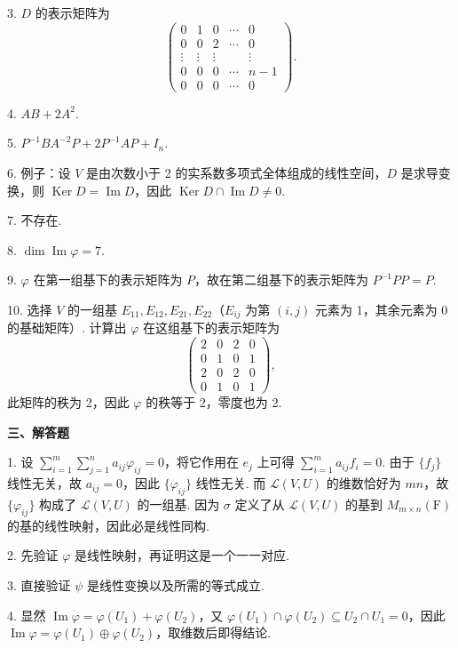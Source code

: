 \documentclass[UTF8, 12pt, fontset=fandol, oneside]{ctexart}
\begin{document}
3. $D$ 的表示矩阵为
\[
\left(\begin{array}{ccccc}
0 & 1 & 0 & \cdots & 0\\
0 & 0 & 2 & \cdots & 0\\
\vdots & \vdots & \vdots &        & \vdots\\
0 & 0 & 0 & \cdots & n-1\\
0 & 0 & 0 & \cdots & 0
\end{array}\right).
\]

4. $AB+2A^2$.

5. $P^{-1}BA^{-2}P+2P^{-1}AP+I_n$.

6. 例子：设 $V$ 是由次数小于 2 的实系数多项式全体组成的线性空间，$D$ 是求导变换，则 $\operatorname{Ker}D=\operatorname{Im}D$，因此 $\operatorname{Ker}D\cap\operatorname{Im}D\ne0$.

7. 不存在.

8. $\dim\operatorname{Im}\varphi=7$.

9. $\varphi$ 在第一组基下的表示矩阵为 $P$，故在第二组基下的表示矩阵为 $P^{-1}PP=P$.

10. 选择 $V$ 的一组基 $E_{11},E_{12},E_{21},E_{22}$（$E_{ij}$ 为第 $(i,j)$ 元素为 1，其余元素为 0 的基础矩阵）. 计算出 $\varphi$ 在这组基下的表示矩阵为
\[
\left(\begin{array}{rrrr}
2 & 0 & 2 & 0\\
0 & 1 & 0 & 1\\
2 & 0 & 2 & 0\\
0 & 1 & 0 & 1
\end{array}\right),
\]
此矩阵的秩为 2，因此 $\varphi$ 的秩等于 2，零度也为 2.

\noindent\textbf{三、解答题}

1. 设 $\sum_{i=1}^m\sum_{j=1}^n a_{ij}\varphi_{ij}=0$，将它作用在 $e_j$ 上可得 $\sum_{i=1}^m a_{ij}f_i=0$. 由于 $\{f_j\}$ 线性无关，故 $a_{ij}=0$，因此 $\{\varphi_{ij}\}$ 线性无关. 而 $\mathcal{L}(V,U)$ 的维数恰好为 $mn$，故 $\{\varphi_{ij}\}$ 构成了 $\mathcal{L}(V,U)$ 的一组基. 因为 $\sigma$ 定义了从 $\mathcal{L}(V,U)$ 的基到 $M_{m\times n}(\mathrm{F})$ 的基的线性映射，因此必是线性同构.

2. 先验证 $\varphi$ 是线性映射，再证明这是一个一一对应.

3. 直接验证 $\psi$ 是线性变换以及所需的等式成立.

4. 显然 $\operatorname{Im}\varphi=\varphi(U_1)+\varphi(U_2)$，又 $\varphi(U_1)\cap\varphi(U_2)\subseteq U_2\cap U_1=0$，因此 $\operatorname{Im}\varphi=\varphi(U_1)\oplus\varphi(U_2)$，取维数后即得结论.
\end{document}

